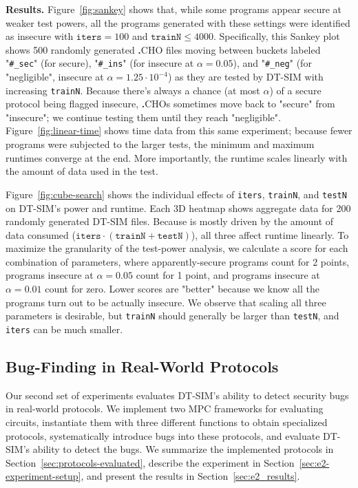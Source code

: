 \documentclass[compsoc, conference, a4paper, 10pt, times]{IEEEtran}
\renewcommand{\paragraph}[1]{\vspace*{2pt}\noindent\textbf{#1}}
\newcommand{\langname}{\textsc{\textbf{.}CHO}\xspace}
\newcommand{\toolname}{\textsc{DT-SIM}\xspace}
\begin{document}
\paragraph{Results.}
Figure~\ref{fig:sankey} shows that, while some programs appear secure at weaker test powers,
all the programs generated with these settings were identified as insecure with $\texttt{iters}=100$ and $\texttt{trainN}\leq4000$.
Specifically, this Sankey plot shows 500 randomly generated \langname files moving between buckets labeled
"\texttt{\#\_sec}" (for secure),
"\texttt{\#\_ins}" (for insecure at $\alpha=0.05$),
and "\texttt{\#\_neg}" (for "negligible", insecure at $\alpha=1.25 \cdot 10^{-4}$)
as they are tested by \toolname with increasing \texttt{trainN}.
Because there's always a chance (at most $\alpha$) of a secure protocol being flagged insecure,
\langname{}s sometimes move back to "secure" from "insecure"; we continue testing them until they reach "negligible".
Figure~\ref{fig:linear-time} shows time data from this same experiment;
because fewer programs were subjected to the larger tests, the minimum and maximum runtimes converge at the end.
More importantly, the runtime scales linearly with the amount of data used in the test.

Figure~\ref{fig:cube-search} shows the individual effects of \texttt{iters}, \texttt{trainN}, and \texttt{testN} on \toolname's power and runtime.
Each 3D heatmap shows aggregate data for 200 randomly generated \toolname files.
Because is mostly driven by the amount of data consumed ($\texttt{iters} \cdot (\texttt{trainN} + \texttt{testN})$),
all three affect runtime linearly.
To maximize the granularity of the test-power analysis, we calculate a score for each combination of parameters,
where apparently-secure programs count for 2 points,
programs insecure at $\alpha=0.05$ count for 1 point,
and programs insecure at $\alpha=0.01$ count for zero.
Lower scores are "better" because we know all the programs turn out to be actually insecure.
We observe that scaling all three parameters is desirable,
but \texttt{trainN} should generally be larger than \texttt{testN},
and \texttt{iters} can be much smaller.


\subsection{Bug-Finding in Real-World Protocols}
\label{sec:case-study-protocols}

Our second set of experiments evaluates \toolname's ability to detect security bugs in real-world protocols. We implement two MPC frameworks for evaluating circuits, instantiate them with three different functions to obtain specialized protocols, systematically introduce bugs into these protocols, and evaluate \toolname's ability to detect the bugs. We summarize the implemented protocols in Section~\ref{sec:protocols-evaluated}, describe the experiment in Section~\ref{sec:e2-experiment-setup}, and present the results in Section~\ref{sec:e2_results}.
\end{document}
